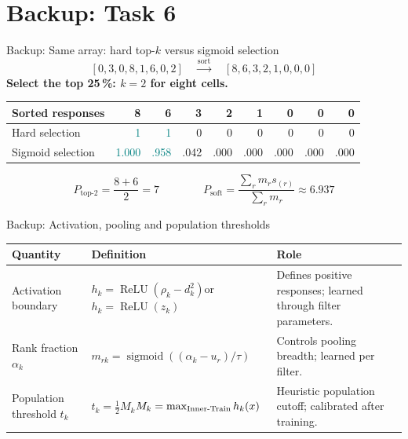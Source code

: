 \documentclass[aspectratio=169,10pt]{beamer}
\newcommand{\relu}{\operatorname{ReLU}}
\newcommand{\sig}{\operatorname{sigmoid}}
\newcommand{\slidelabel}{SSBI}
\begin{document}
\renewcommand{\slidelabel}{SSBI · Task 6 · Backup}
\section{Backup: Task 6}

\begin{frame}{Backup: Same array: hard top-$k$ versus sigmoid selection}
\[ [0,3,0,8,1,6,0,2]\quad\xrightarrow{\text{sort}}\quad [8,6,3,2,1,0,0,0]\]
\textbf{Select the top 25\,\%: $k=2$ for eight cells.}
\begin{center}\renewcommand{\arraystretch}{1.4}
\begin{tabular}{@{}lrrrrrrrr@{}}\toprule
Sorted responses & 8 & 6 & 3 & 2 & 1 & 0 & 0 & 0\\\midrule
Hard selection & \textcolor{Teal}{1} & \textcolor{Teal}{1} & 0 & 0 & 0 & 0 & 0 & 0\\
Sigmoid selection & \textcolor{Teal}{1.000} & \textcolor{Teal}{.958} & \textcolor{Amber}{.042} & .000 & .000 & .000 & .000 & .000\\\bottomrule
\end{tabular}\end{center}
\[P_{\mathrm{top}\text{-}2}=\frac{8+6}{2}=7
\qquad\qquad P_{\mathrm{soft}}=\frac{\sum_r m_rs_{(r)}}{\sum_r m_r}\approx6.937\]
\end{frame}

\begin{frame}{Backup: Activation, pooling and population thresholds}

\renewcommand{\arraystretch}{1.7}
\begin{tabular}{@{}p{.24\linewidth}p{.33\linewidth}>{\raggedright\arraybackslash}p{.37\linewidth}@{}}\toprule
Quantity & Definition & Role\\\midrule
Activation boundary & $h_k=\relu(\rho_k-d_k^2)$\newline or $h_k=\relu(z_k)$ & Defines positive responses; learned through filter parameters.\\
Rank fraction $\alpha_k$ & $m_{rk}=\sig((\alpha_k-u_r)/\tau)$ & Controls pooling breadth; learned per filter.\\
Population threshold $t_k$ & $t_k=\tfrac12 M_k$\newline $M_k=\max_{\rm Inner\text{-}Train}h_k(x)$ & Heuristic population cutoff; calibrated after training.\\\bottomrule
\end{tabular}

\end{frame}
\end{document}
